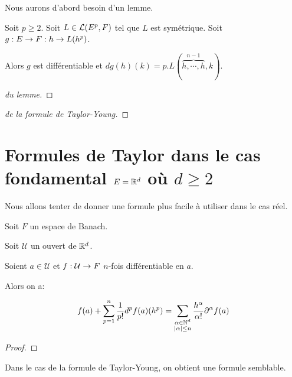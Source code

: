 Nous aurons d'abord besoin d'un lemme.

\begin{lemma}
	Soit $p \geq 2$. Soit $L \in \mathcal{L}(E^{p}, F)$ tel que $L$ est
	symétrique.
	Soit $g : E \rightarrow F : h \rightarrow L(h^{p})$.

	Alors $g$ est différentiable et $dg(h)(k) = p.L(\overbrace{h,
	\cdots, h}^{n - 1}, k)$.
\end{lemma}

\ifdefined\outputproof
\begin{proof} [du lemme]

\end{proof}
\fi

\ifdefined\outputproof
\begin{proof} [de la formule de Taylor-Young]

\end{proof}
\fi

\section{Formules de Taylor dans le cas fondamental $E = \mathbb{R}^{d}$ où $d \geq
2$}

Nous allons tenter de donner une formule plus facile à utiliser dans le cas
réel.


\begin{theorem} 
	\label{theorem:taylor_formula_real_case}
	Soit $F$ un espace de Banach.

	Soit $\mathcal{U}$ un ouvert de $\mathbb{R}^{d}$.

	Soient $a \in \mathcal{U}$ et $f : \mathcal{U} \rightarrow F$ $n$-fois
	différentiable en $a$.

	Alors on a:

	\begin{equation*}
		f(a) + \displaystyle \sum_{p = 1}^{n} \frac{1}{p!} d^{p}f(a)(h^{p}) =
		\sum_{\substack{\alpha \in \mathbb{N}^{d} \\ |\alpha| \leq n}}
		\frac{h^{\alpha}}{\alpha !} \partial^{\alpha}f(a)
	\end{equation*}
\end{theorem}

\ifdefined\outputproof
\begin{proof}

\end{proof}
\fi

Dans le cas de la formule de Taylor-Young, on obtient une formule semblable.

